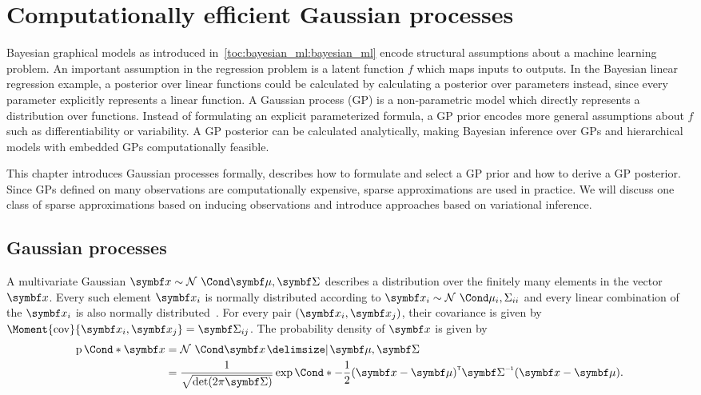 \chapter{Computationally efficient Gaussian processes}
\label{toc:gp}
Bayesian graphical models as introduced in~\cref{toc:bayesian_ml:bayesian_ml} encode structural assumptions about a machine learning problem.
An important assumption in the regression problem is a latent function $f$ which maps inputs to outputs.
In the Bayesian linear regression example, a posterior over linear functions could be calculated by calculating a posterior over parameters instead, since every parameter explicitly represents a linear function.
A Gaussian process (GP) is a non-parametric model which directly represents a distribution over functions.
Instead of formulating an explicit parameterized formula, a GP prior encodes more general assumptions about $f$ such as differentiability or variability.
A GP posterior can be calculated analytically, making Bayesian inference over GPs and hierarchical models with embedded GPs computationally feasible.

This chapter introduces Gaussian processes formally, describes how to formulate and select a GP prior and how to derive a GP posterior.
Since GPs defined on many observations are computationally expensive, sparse approximations are used in practice.
We will discuss one class of sparse approximations based on inducing observations and introduce approaches based on variational inference.

\section{Gaussian processes}
A multivariate Gaussian $\mat{x} \sim \Gaussian{\mat{\mu}, \mat{\Sigma}}$ describes a distribution over the finitely many elements in the vector $\mat{x}$.
Every such element $\rv{x}_i$ is normally distributed according to $\rv{x}_i \sim \Gaussian{\mu_i, \Sigma_{ii}}$ and every linear combination of the $\mat{x}_i$ is also normally distributed~\parencite{astrom_introduction_1971}.
For every pair $(\rv{x}_i, \rv{x}_j)$, their covariance is given by $\Moment{\cov}{\rv{x}_i, \rv{x}_j} = \mat{\Sigma}_{ij}$.
The probability density of $\mat{x}$ is given by
\begin{align}
    \begin{split}
        \label{eq:gaussian_pdf}
        \Prob*{\mat{x}}
        &= \Gaussian{\mat{x} \given \mat{\mu}, \mat{\Sigma}} \\
        &= \frac{1}{\sqrt{\det(2\pi\mat{\Sigma})}}\Fun*{\exp}{-\frac{1}{2}(\mat{x} - \mat{\mu})\tran \mat{\Sigma}\inv (\mat{x} - \mat{\mu})}.
    \end{split}
\end{align}

